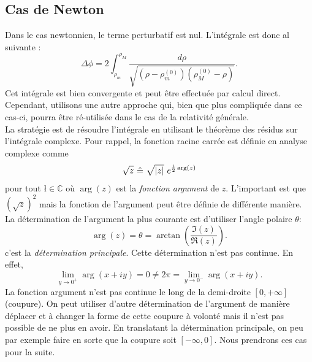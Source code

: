 \documentclass[a4paper,11pt]{report}
\begin{document}
        \subsection{Cas de Newton}
        
            Dans le cas newtonnien, le terme perturbatif est nul. L'intégrale est donc al suivante :
            \begin{equation}
                \Delta\phi = 2\int^{\rho_M}_{\rho_m}\frac{d\rho}{\sqrt{\left( \rho-\rho^{(0)}_m \right)\left( \rho^{(0)}_M-\rho \right)}}.
            \end{equation}
            Cet intégrale est bien convergente et peut être effectuée par calcul direct. Cependant, utilisons une autre approche qui, bien que plus compliquée dans ce cas-ci, pourra être ré-utilisée dans le cas de la relativité générale.\\
            
            La stratégie est de résoudre l'intégrale en utilisant le théorème des résidus sur l'intégrale complexe. Pour rappel, la fonction racine carrée est définie en analyse complexe comme
            \begin{equation}
                \sqrt{z}~\hat{=}~\sqrt{\abs{z}}~e^{\frac{i}{2}\arg(z)}
            \end{equation}
            pour tout $ł\in\mathbb{C}$ où $\arg(z)$ est la \textit{fonction argument} de $z$. L'important est que $(\sqrt{z})^2$ mais la fonction de l'argument peut être définie de différente manière. La détermination de l'argument la plus courante est d'utiliser l'angle polaire $\theta$:
            \begin{equation}
                \arg(z) = \theta = \arctan\left(\frac{\Im(z)}{\Re(z)}\right).
            \end{equation}
            c'est la \textit{détermination principale}. Cette détermination n'est pas continue. En effet, 
            \begin{equation}
                \lim\limits_{y\to0^+} \arg(x+iy) = 0 \neq 2\pi = \lim\limits_{y\to0^-} \arg(x+iy).
            \end{equation}
            La fonction argument n'est pas continue le long de la demi-droite $[0,+\infty]$ (coupure). On peut utiliser d'autre détermination de l'argument de manière déplacer et à changer la forme de cette coupure à volonté mais il n'est pas possible de ne plus en avoir. En translatant la détermination principale, on peu par exemple faire en sorte que la coupure soit $[-\infty,0]$. Nous prendrons ces cas pour la suite.
            
\end{document}
